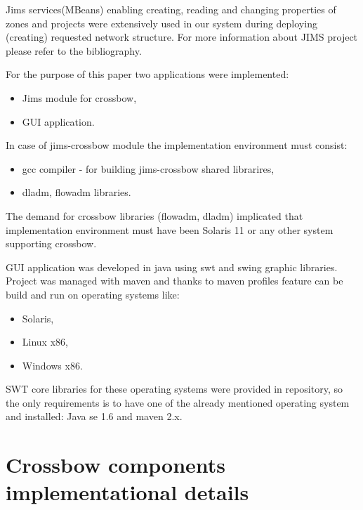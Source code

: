 \documentclass[11pt]{book}
\begin{document}
      Jims services(MBeans) enabling creating, reading and changing properties of zones and projects were extensively
      used in our system during deploying (creating) requested network structure. For more information about JIMS
      project please refer to the bibliography.	
    
      \medskip
	
      For the purpose of this paper two applications were implemented:
	
      \begin{itemize}
        \item Jims module for crossbow,
        \item GUI application.
      \end{itemize}
	
      \medskip
	
      In case of jims-crossbow module the implementation environment must consist:

      \begin{itemize}
        \item gcc compiler - for building jims-crossbow shared librarires,
        \item dladm, flowadm libraries.
      \end{itemize}
	
      The demand for crossbow libraries (flowadm, dladm) implicated that implementation environment must have been
      Solaris 11 or any other system supporting crossbow.
    
      GUI application was developed in java using swt and swing graphic libraries. Project was managed with maven and
      thanks to maven profiles feature can be build and run on operating systems like:

      \begin{itemize}
        \item Solaris,
        \item Linux x86,
        \item Windows x86.
      \end{itemize}

      SWT core libraries for these operating systems were provided in repository, so the only requirements is to have
      one of the already mentioned operating system and installed: Java se 1.6 and maven 2.x.
		
		
    \section{Crossbow components implementational details}
    \label{sec:impl:comp}
	
\end{document}

